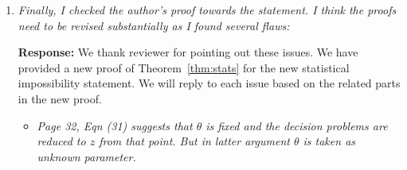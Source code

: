 \documentclass[11pt]{article}
\theoremstyle{definition}
\theoremstyle{definition}
\begin{document}
\begin{enumerate}
\begin{enumerate}[wide]
    
    \item \textit{Finally, I checked the author’s proof towards the statement. I think the proofs need to be revised substantially as I found several flaws:} 
    
    \textbf{Response:} We thank reviewer for pointing out these issues. We have provided a new proof of Theorem~\ref{thm:stats} for the new statistical impossibility statement. We will reply to each issue based on the related parts in the new proof. 
    
    
    \begin{itemize}
        \item \textit{Page 32, Eqn (31) suggests that $\theta$ is fixed and the decision problems are reduced to $z$ from that point. But in latter argument $\theta$ is taken as unknown parameter.}
        

\end{itemize}
\end{enumerate}
\end{enumerate}
\end{document}
